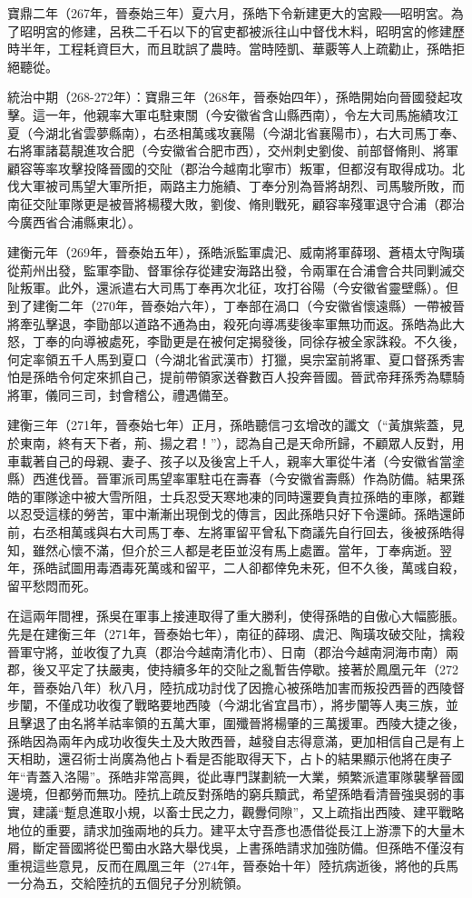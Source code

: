 寶鼎二年（267年，晉泰始三年）夏六月，孫皓下令新建更大的宮殿──昭明宮。為了昭明宮的修建，呂秩二千石以下的官吏都被派往山中督伐木料，昭明宮的修建歷時半年，工程耗資巨大，而且耽誤了農時。當時陸凱、華覈等人上疏勸止，孫皓拒絕聽從。

統治中期（268-272年）：寶鼎三年（268年，晉泰始四年），孫皓開始向晉國發起攻擊。這一年，他親率大軍屯駐東關（今安徽省含山縣西南），令左大司馬施績攻江夏（今湖北省雲夢縣南），右丞相萬彧攻襄陽（今湖北省襄陽市），右大司馬丁奉、右將軍諸葛靚進攻合肥（今安徽省合肥市西），交州刺史劉俊、前部督脩則、將軍顧容等率攻擊投降晉國的交阯（郡治今越南北寧市）叛軍，但都沒有取得成功。北伐大軍被司馬望大軍所拒，兩路主力施績、丁奉分別為晉將胡烈、司馬駿所敗，而南征交阯軍隊更是被晉將楊稷大敗，劉俊、脩則戰死，顧容率殘軍退守合浦（郡治今廣西省合浦縣東北）。

建衡元年（269年，晉泰始五年），孫皓派監軍虞汜、威南將軍薛珝、蒼梧太守陶璜從荊州出發，監軍李勖、督軍徐存從建安海路出發，令兩軍在合浦會合共同剿滅交阯叛軍。此外，還派遣右大司馬丁奉再次北征，攻打谷陽（今安徽省靈壁縣）。但到了建衡二年（270年，晉泰始六年），丁奉部在渦口（今安徽省懷遠縣）一帶被晉將牽弘擊退，李勖部以道路不通為由，殺死向導馮斐後率軍無功而返。孫皓為此大怒，丁奉的向導被處死，李勖更是在被何定揭發後，同徐存被全家誅殺。不久後，何定率領五千人馬到夏口（今湖北省武漢市）打獵，吳宗室前將軍、夏口督孫秀害怕是孫皓令何定來抓自己，提前帶領家送眷數百人投奔晉國。晉武帝拜孫秀為驃騎將軍，儀同三司，封會稽公，禮遇備至。

建衡三年（271年，晉泰始七年）正月，孫皓聽信刁玄增改的讖文（“黃旗紫蓋，見於東南，終有天下者，荊、揚之君！”），認為自己是天命所歸，不顧眾人反對，用車載著自己的母親、妻子、孩子以及後宮上千人，親率大軍從牛渚（今安徽省當塗縣）西進伐晉。晉軍派司馬望率軍駐屯在壽春（今安徽省壽縣）作為防備。結果孫皓的軍隊途中被大雪所阻，士兵忍受天寒地凍的同時還要負責拉孫皓的車隊，都難以忍受這樣的勞苦，軍中漸漸出現倒戈的傳言，因此孫皓只好下令還師。孫皓還師前，右丞相萬彧與右大司馬丁奉、左將軍留平曾私下商議先自行回去，後被孫皓得知，雖然心懷不滿，但介於三人都是老臣並沒有馬上處置。當年，丁奉病逝。翌年，孫皓試圖用毒酒毒死萬彧和留平，二人卻都倖免未死，但不久後，萬彧自殺，留平愁悶而死。

在這兩年間裡，孫吳在軍事上接連取得了重大勝利，使得孫皓的自傲心大幅膨脹。先是在建衡三年（271年，晉泰始七年），南征的薛珝、虞汜、陶璜攻破交阯，擒殺晉軍守將，並收復了九真（郡治今越南清化市）、日南（郡治今越南洞海市南）兩郡，後又平定了扶嚴夷，使持續多年的交阯之亂暫告停歇。接著於鳳凰元年（272年，晉泰始八年）秋八月，陸抗成功討伐了因擔心被孫皓加害而叛投西晉的西陵督步闡，不僅成功收復了戰略要地西陵（今湖北省宜昌市），將步闡等人夷三族，並且擊退了由名將羊祜率領的五萬大軍，圍殲晉將楊肇的三萬援軍。西陵大捷之後，孫皓因為兩年內成功收復失土及大敗西晉，越發自志得意滿，更加相信自己是有上天相助，還召術士尚廣為他占卜看是否能取得天下，占卜的結果顯示他將在庚子年“青蓋入洛陽”。孫皓非常高興，從此專門謀劃統一大業，頻繁派遣軍隊襲擊晉國邊境，但都勞而無功。陸抗上疏反對孫皓的窮兵黷武，希望孫皓看清晉強吳弱的事實，建議“蹔息進取小規，以畜士民之力，觀釁伺隙”，又上疏指出西陵、建平戰略地位的重要，請求加強兩地的兵力。建平太守吾彥也憑借從長江上游漂下的大量木屑，斷定晉國將從巴蜀由水路大舉伐吳，上書孫皓請求加強防備。但孫皓不僅沒有重視這些意見，反而在鳳凰三年（274年，晉泰始十年）陸抗病逝後，將他的兵馬一分為五，交給陸抗的五個兒子分別統領。

